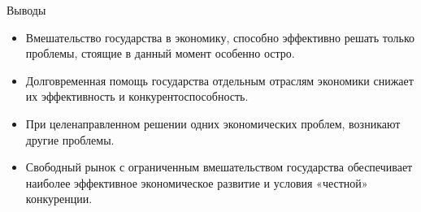 \documentclass{beamer}
\begin{document}
	\begin{frame}{Выводы}
		\begin{itemize}
			\item Вмешательство государства в экономику, способно эффективно решать только проблемы, стоящие в данный момент особенно остро.
			\item Долговременная помощь государства отдельным отраслям экономики снижает их эффективность и конкурентоспособность.
			\item При целенаправленном решении одних экономических проблем, возникают другие проблемы.
			\item Свободный рынок с ограниченным вмешательством государства обеспечивает наиболее эффективное экономическое развитие и условия «честной» конкуренции.
		\end{itemize}
	\end{frame}
\end{document}
